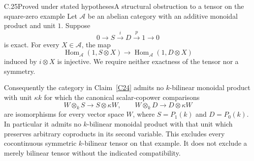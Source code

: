 \begin{claim}{C.25}{Proved under stated hypotheses}{A structural obstruction to a tensor on the square-zero example}\label{C25}
Let $\mathcal A$ be an abelian category with an additive monoidal product and unit $1$. Suppose
\[
0\longrightarrow S\xrightarrow{i}D\xrightarrow{p}1\longrightarrow0
\]
is exact. For every $X\in\mathcal A$, the map
\[
\operatorname{Hom}_{\mathcal A}(1,S\otimes X)
\longrightarrow\operatorname{Hom}_{\mathcal A}(1,D\otimes X)
\]
induced by $i\otimes X$ is injective. We require neither exactness of the tensor nor a symmetry.

Consequently the category in Claim~\ref{C24} admits no $k$-bilinear monoidal product with unit $\kappa k$ for which the canonical scalar-copower comparisons
\[
W\otimes_k S\longrightarrow S\otimes\kappa W,
\qquad
W\otimes_k D\longrightarrow D\otimes\kappa W
\]
are isomorphisms for every vector space $W$, where $S=P_1(k)$ and $D=P_0(k)$. In particular it admits no $k$-bilinear monoidal product with that unit which preserves arbitrary coproducts in its second variable. This excludes every cocontinuous symmetric $k$-bilinear tensor on that example. It does not exclude a merely bilinear tensor without the indicated compatibility.
\end{claim}
